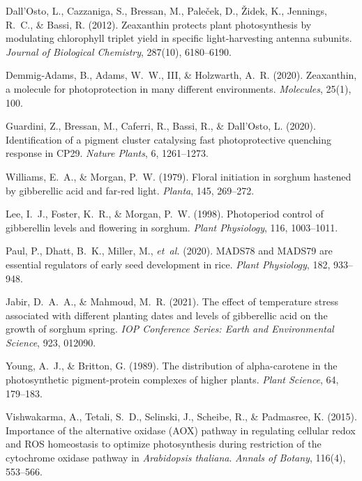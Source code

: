 \documentclass[10pt,letterpaper]{article}
\begin{document}
\begin{thebibliography}{10}


Dall’Osto, L., Cazzaniga, S., Bressan, M., Paleček, D., Židek, K., Jennings, R.~C., \& Bassi, R. (2012).  
Zeaxanthin protects plant photosynthesis by modulating chlorophyll triplet yield in specific light‐harvesting antenna subunits.  
\emph{Journal of Biological Chemistry}, 287(10), 6180–6190.

Demmig‐Adams, B., Adams, W.~W., III, \& Holzwarth, A.~R. (2020).  
Zeaxanthin, a molecule for photoprotection in many different environments.  
\emph{Molecules}, 25(1), 100.

Guardini, Z., Bressan, M., Caferri, R., Bassi, R., \& Dall’Osto, L. (2020).  
Identification of a pigment cluster catalysing fast photoprotective quenching response in CP29.  
\emph{Nature Plants}, 6, 1261–1273.


Williams, E.~A., \& Morgan, P.~W. (1979).  
Floral initiation in sorghum hastened by gibberellic acid and far‐red light.  
\emph{Planta}, 145, 269–272.

Lee, I.~J., Foster, K.~R., \& Morgan, P.~W. (1998).  
Photoperiod control of gibberellin levels and flowering in sorghum.  
\emph{Plant Physiology}, 116, 1003–1011.

Paul, P., Dhatt, B.~K., Miller, M., \emph{et~al.} (2020).  
MADS78 and MADS79 are essential regulators of early seed development in rice.  
\emph{Plant Physiology}, 182, 933–948.

Jabir, D.~A.~A., \& Mahmoud, M.~R. (2021).  
The effect of temperature stress associated with different planting dates and levels of gibberellic acid on the growth of sorghum spring.  
\emph{IOP Conference Series: Earth and Environmental Science}, 923, 012090.

Young, A.~J., \& Britton, G. (1989).
\newblock The distribution of alpha-carotene in the photosynthetic pigment-protein complexes of higher plants.
\newblock \emph{Plant Science}, 64, 179–183.

Vishwakarma, A., Tetali, S.~D., Selinski, J., Scheibe, R., \& Padmasree, K. (2015).
\newblock Importance of the alternative oxidase (AOX) pathway in regulating cellular redox and ROS homeostasis to optimize photosynthesis during restriction of the cytochrome oxidase pathway in \emph{Arabidopsis thaliana}.
\newblock \emph{Annals of Botany}, 116(4), 553–566.
\newblock {}


\end{thebibliography}
\end{document}
